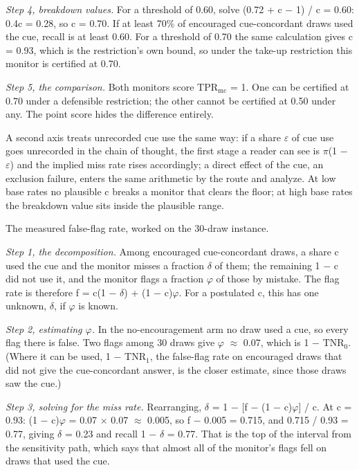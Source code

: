 \documentclass[11pt,a4paper]{article}
\begin{document}
\emph{Step 4, breakdown values.} For a threshold of 0.60, solve (0.72 + c $-$ 1) / c = 0.60: 0.4c = 0.28, so c = 0.70. If at least 70\% of encouraged cue-concordant draws used the cue, recall is at least 0.60. For a threshold of 0.70 the same calculation gives c = 0.93, which is the restriction's own bound, so under the take-up restriction this monitor is certified at 0.70.

\emph{Step 5, the comparison.} Both monitors score $\mathrm{TPR}_{\mathrm{mc}}$ = 1. One can be certified at 0.70 under a defensible restriction; the other cannot be certified at 0.50 under any. The point score hides the difference entirely.

A second axis treats unrecorded cue use the same way: if a share $\varepsilon$ of cue use goes unrecorded in the chain of thought, the first stage a reader can see is $\pi$(1 $-$ $\varepsilon$) and the implied miss rate rises accordingly; a direct effect of the cue, an exclusion failure, enters the same arithmetic by the route \citet{jo2002estimation} and \citet{conley2012plausibly} analyze. At low base rates no plausible c breaks a monitor that clears the floor; at high base rates the breakdown value sits inside the plausible range.

The measured false-flag rate, worked on the 30-draw instance.

\emph{Step 1, the decomposition.} Among encouraged cue-concordant draws, a share c used the cue and the monitor misses a fraction $\delta$ of them; the remaining 1 $-$ c did not use it, and the monitor flags a fraction $\varphi$ of those by mistake. The flag rate is therefore f = c(1 $-$ $\delta$) + (1 $-$ c)$\varphi$. For a postulated c, this has one unknown, $\delta$, if $\varphi$ is known.

\emph{Step 2, estimating $\varphi$.} In the no-encouragement arm no draw used a cue, so every flag there is false. Two flags among 30 draws give $\varphi$ $\approx$ 0.07, which is 1 $-$ $\mathrm{TNR}_0$. (Where it can be used, 1 $-$ $\mathrm{TNR}_1$, the false-flag rate on encouraged draws that did not give the cue-concordant answer, is the closer estimate, since those draws saw the cue.)

\emph{Step 3, solving for the miss rate.} Rearranging, $\delta$ = 1 $-$ [f $-$ (1 $-$ c)$\varphi$] / c. At c = 0.93: (1 $-$ c)$\varphi$ = 0.07 $\times$ 0.07 $\approx$ 0.005, so f $-$ 0.005 = 0.715, and 0.715 / 0.93 = 0.77, giving $\delta$ = 0.23 and recall 1 $-$ $\delta$ = 0.77. That is the top of the interval from the sensitivity path, which says that almost all of the monitor's flags fell on draws that used the cue.
\end{document}
